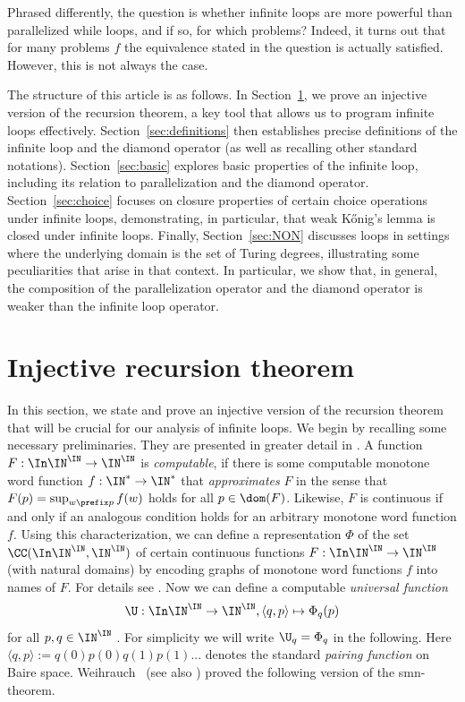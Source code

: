 \noindent
Phrased differently, the question is whether infinite loops are more powerful than parallelized while loops,
and if so, for which problems?
Indeed, it turns out that for many problems $f$ the equivalence stated in the question is actually satisfied.
However, this is not always the case.

The structure of this article is as follows. 
In Section~\ref{sec:recursion}, we prove an injective version of the recursion theorem, a key tool that allows us to program infinite loops effectively. 
Section~\ref{sec:definitions} then establishes precise definitions of the infinite loop and the diamond operator (as well as recalling other standard notations). Section~\ref{sec:basic} explores basic properties of the infinite loop, including its relation to parallelization and the diamond operator. Section~\ref{sec:choice} focuses on closure properties of certain choice operations under infinite loops, demonstrating, in particular, that weak K\H{o}nig's lemma is closed under infinite loops. Finally, Section~\ref{sec:NON} discusses loops in settings where the underlying domain is the set of Turing degrees, illustrating some peculiarities that arise in that context. In particular, we show that, in general, the composition of the parallelization operator
and the diamond operator is weaker than the infinite loop operator.


\section{Injective recursion theorem}
\label{sec:recursion}

In this section, we state and prove an injective version of the recursion theorem that will be crucial for our analysis of infinite loops. We begin by recalling some necessary preliminaries. They 
are presented in greater detail in \cite{Bra23}.
A function $F:\In\IN^\IN\to\IN^\IN$ is {\em computable}, if there is some computable monotone word function 
${f:\IN^*\to\IN^*}$
that {\em approximates} $F$ in the sense that $F(p)=\sup_{w\prefix p}f(w)$ holds for all $p\in\dom(F)$. 
Likewise, $F$ is continuous if and only if an analogous condition holds for an arbitrary monotone word function $f$.
Using this characterization, we can define a representation $\Phi$ of the set $\CC(\In\IN^\IN,\IN^\IN)$ of certain continuous functions 
$F:\In\IN^\IN\to\IN^\IN$ (with natural domains) by encoding graphs of monotone word functions $f$ into names of $F$. 
For details see \cite{Wei87}.
Now we can define a computable {\em universal function} 
\[\U:\In\IN^\IN\to\IN^\IN,\langle q,p\rangle\mapsto\Phi_q(p)\] 
for all $p,q\in\IN^\IN$ \cite[Theorem~3.2.16~(1)]{Wei87}. 
For simplicity we will write $\U_q=\Phi_q$ in the following.
Here $\langle q,p\rangle:=q(0)p(0)q(1)p(1)...$ denotes the standard {\em pairing function} on Baire space.
Weihrauch~\cite[Theorems~3.5, 2.10, Corollary~2.11]{Wei85} (see also \cite[Theorem~3.2.16]{Wei87}) proved the following version of the smn-theorem.

